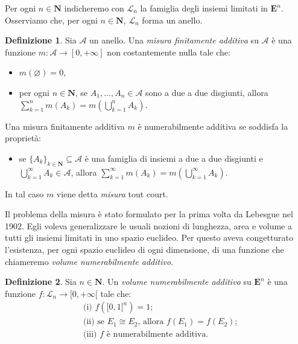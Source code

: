 \documentclass[a4paper,oneside,11pt]{book}
\theoremstyle{definition} \newtheorem{Def}{Definizione}
\theoremstyle{plain} \newtheorem{teo}{Teorema}
\theoremstyle{plain} \newtheorem{cor}[teo]{Corollario}
\theoremstyle{definition} \newtheorem{lem}[teo]{Lemma}
\theoremstyle{plain} \newtheorem{pro}[teo]{Proposizione}
\begin{document}
	Per ogni $n \in \mathbf{N}$ indicheremo con $\mathcal{L}_n$ la famiglia degli insiemi limitati in $\mathbf{E}^n$. Osserviamo che, per ogni $n \in \mathbf{N}$, $\mathcal{L}_n$ forma un anello.
	
	 \begin{Def}\label{defmis}
	 	Sia $\mathcal{A}$ un anello. Una \emph{misura finitamente additiva} su $\mathcal{A}$ è una funzione $m: \mathcal{A} \to [0, +\infty]$ non costantemente nulla tale che:%
	 	\begin{itemize}
	 		\item $m(\varnothing) = 0$,
	 		\item per ogni $n \in \mathbf{N}$, se $A_1, \dots, A_n \in \mathcal{A}$ sono a due a due disgiunti, allora $\sum\limits_{k=1}^n m(A_k) = m \left(\bigcup\limits_{k=1}^n A_k \right)$.
	 	\end{itemize}
	 	Una misura finitamente additiva $m$ è numerabilmente additiva se soddisfa la proprietà:
	 	\begin{itemize}
	 		\item se $\{A_k\}_{k \in \mathbf{N}} \subseteq \mathcal{A}$ è una famiglia di insiemi a due a due disgiunti e \\$\bigcup\limits_{k=1}^\infty A_k \in \mathcal{A}$, allora $\sum\limits_{k=1}^\infty m(A_k) = m\left(\bigcup\limits_{k=1}^\infty A_k\right)$.
	 	\end{itemize}
	 	In tal caso $m$ viene detta \emph{misura} tout court.
	\end{Def}
	
	Il problema della misura è stato formulato per la prima volta da Lebesgue nel 1902. Egli voleva generalizzare le usuali nozioni di lunghezza, area e volume a tutti gli insiemi limitati in uno spazio euclideo. Per questo aveva congetturato l'esistenza, per ogni spazio euclideo di ogni dimensione, di una funzione che chiameremo \emph{volume numerabilmente additivo}.
	
	\begin{Def}
		Sia $n \in \mathbf{N}$. Un \emph{volume numerabilmente additivo} su $\mathbf{E}^n$ è una funzione $f: \mathcal{L}_n \to [0, +\infty[$ tale che: %
	\begin{equation}\label{defprobmissba} %
		\begin{aligned}
			&\text{(i) } f([0,1[^n) = 1 \text{;}\\%
			&\text{(ii) } \text{se } E_1 \cong E_2 \text{, allora } f(E_1) = f(E_2) \text{;}\\
			&\text{(iii) } f \text{ è numerabilmente additiva.}\\
		\end{aligned}
	\end{equation} 
	\end{Def}
	
\end{document}
